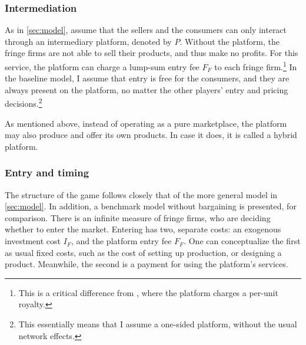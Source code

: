 \documentclass[a4paper]{article}
\begin{document}
\subsubsection{Intermediation}

As in \cref{sec:model}, assume that the sellers and the consumers can only interact through an intermediary platform, denoted by $P$.
Without the platform, the fringe firms are not able to sell their products, and thus make no profits.
For this service, the platform can charge a lump-sum entry fee $F_F$ to each fringe firm.\footnote{
    This is a critical difference from \textcite[]{anderson2021hybrid}, where the platform charges a per-unit royalty.
}
In the baseline model, I assume that entry is free for the consumers, and they are always present on the platform, no matter the other players' entry and pricing decisions.\footnote{
    This essentially means that I assume a one-sided platform, without the usual network effects.
}

As mentioned above, instead of operating as a pure marketplace, the platform may also produce and offer its own products.
In case it does, it is called a hybrid platform.

\subsubsection{Entry and timing}

The structure of the game follows closely that of the more general model in \cref{sec:model}.
In addition, a benchmark model without bargaining is presented, for comparison.
There is an infinite measure of fringe firms, who are deciding whether to enter the market.
Entering has two, separate costs: an exogenous investment cost $I_F$, and the platform entry fee $F_F$.
One can conceptualize the first as usual fixed costs, such as the cost of setting up production, or designing a product.
Meanwhile, the second is a payment for using the platform's services.
\end{document}
